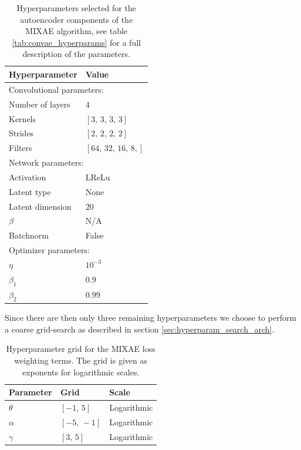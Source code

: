 \documentclass[preprint,12pt]{elsarticle}
\begin{document}
\begin{table}[H]
\renewcommand*{\arraystretch}{0.5}
\centering
\caption{Hyperparameters selected for the autoencoder components of the MIXAE algorithm, see table \ref{tab:convae_hyperparams} for a full description of the parameters.}\label{tab:mixe_ae_hyperparams}
\setlength{\extrarowheight}{15pt}
\hspace*{-0.5in}
\begin{tabular}{ll}
\toprule
Hyperparameter & Value \\
\midrule
\multicolumn{2}{l}{Convolutional parameters: } \\
\midrule
Number of layers & $4$ \\
Kernels & $[3,\,3,\,3,\,3]$\\
Strides & $[2,\,2,\,2,\,2]$ \\
Filters & $[64,\, 32, \,16, \,8,]$ \\ 
\midrule
\multicolumn{2}{l}{Network parameters: } \\
\midrule
Activation & LReLu \\
Latent type & None \\
Latent dimension & 20  \\
$\beta$ & N/A \\
Batchnorm & False \\
\midrule
\multicolumn{2}{l}{Optimizer parameters: } \\
\midrule
$\eta$ & $10^{-3}$ \\
$\beta_1$ & $0.9$ \\
$\beta_2$ & $0.99$ \\
\bottomrule
\end{tabular}
\end{table}

Since there are then only three remaining hyperparameters we choose to perform a coarse grid-search as described in section \ref{sec:hyperparam_search_arch}.

\begin{table}
\centering
\caption{Hyperparameter grid for the MIXAE loss weighting terms. The grid is given as exponents for logarithmic scales.}\label{tab:mixae_loss_weights}
\begin{tabular}{lll}
\toprule
Parameter & Grid & Scale \\
\midrule 
$\theta$ & $[-1,\, 5]$ & Logarithmic \\
$\alpha$ & $[-5,\, -1]$ & Logarithmic \\
$\gamma$ & $[3,\, 5]$ & Logarithmic
\end{tabular}
\end{table}
\end{document}
